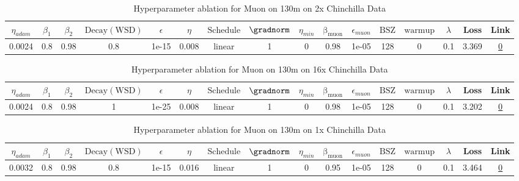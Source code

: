 \begin{table}[H]
\centering
\caption{Hyperparameter ablation for Muon on 130m on 2x Chinchilla Data}
\label{tab:ablation_muon_130m_2}
\begin{tabular}{cccccccccccccccc}
\toprule
$\eta_{adam}$ & $\beta_1$ & $\beta_2$ & $\mathrm{Decay (WSD)}$ & $\epsilon$ & $\eta$ & $\mathrm{Schedule}$ & $\gradnorm$ & $\eta_{min}$ & $\mathrm{\beta_{muon}}$ & $\epsilon_{muon}$ & $\mathrm{BSZ}$ & $\mathrm{warmup}$ & $\lambda$ & Loss & Link \\
\midrule
0.0024 & 0.8 & 0.98 & 0.8 & 1e-15 & 0.008 & linear & 1 & 0 & 0.98 & 1e-05 & 128 & 0 & 0.1 & 3.369 & \href{https://wandb.ai/stanford-mercury/optimizer-scaling/runs/sweep-130m-5B-muon45194alr0.008-wd0.1-minlr0-warmup0-b10.8-b20.9-c1c97c}{0} \\
\midrule
\bottomrule
\end{tabular}
\end{table}

\begin{table}[H]
\centering
\caption{Hyperparameter ablation for Muon on 130m on 16x Chinchilla Data}
\label{tab:ablation_muon_130m_16}
\begin{tabular}{cccccccccccccccc}
\toprule
$\eta_{adam}$ & $\beta_1$ & $\beta_2$ & $\mathrm{Decay (WSD)}$ & $\epsilon$ & $\eta$ & $\mathrm{Schedule}$ & $\gradnorm$ & $\eta_{min}$ & $\mathrm{\beta_{muon}}$ & $\epsilon_{muon}$ & $\mathrm{BSZ}$ & $\mathrm{warmup}$ & $\lambda$ & Loss & Link \\
\midrule
0.0024 & 0.8 & 0.98 & 1 & 1e-25 & 0.008 & linear & 1 & 0 & 0.98 & 1e-05 & 128 & 0 & 0.1 & 3.202 & \href{https://wandb.ai/stanford-mercury/optimizer-scaling/runs/sweep-130m-42B-muoncedd383lr0.008-wd0.1-minlr0-warmup0-b10.8-b20-89555c}{0} \\
\midrule
\bottomrule
\end{tabular}
\end{table}

\begin{table}[H]
\centering
\caption{Hyperparameter ablation for Muon on 130m on 1x Chinchilla Data}
\label{tab:ablation_muon_130m_1}
\begin{tabular}{cccccccccccccccc}
\toprule
$\eta_{adam}$ & $\beta_1$ & $\beta_2$ & $\mathrm{Decay (WSD)}$ & $\epsilon$ & $\eta$ & $\mathrm{Schedule}$ & $\gradnorm$ & $\eta_{min}$ & $\mathrm{\beta_{muon}}$ & $\epsilon_{muon}$ & $\mathrm{BSZ}$ & $\mathrm{warmup}$ & $\lambda$ & Loss & Link \\
\midrule
0.0032 & 0.8 & 0.98 & 0.8 & 1e-15 & 0.016 & linear & 1 & 0 & 0.95 & 1e-05 & 128 & 0 & 0.1 & 3.464 & \href{https://wandb.ai/stanford-mercury/optimizer-scaling/runs/sweep-130m-2B-muon02b4fclr0.016-wd0.1-minlr0-warmup0-b10.8-b20.9-9c2fe9}{0} \\
\midrule
\bottomrule
\end{tabular}
\end{table}

